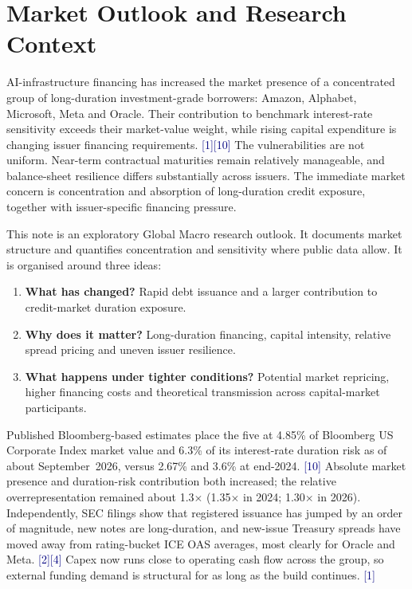 \documentclass[10pt,letterpaper]{article}
\newcommand{\src}[1]{{\scriptsize\textcolor{navy}{[#1]}}}
\begin{document}
\section{Market Outlook and Research Context}

AI-infrastructure financing has increased the market presence of a concentrated group of long-duration investment-grade borrowers: Amazon, Alphabet, Microsoft, Meta and Oracle. Their contribution to benchmark interest-rate sensitivity exceeds their market-value weight, while rising capital expenditure is changing issuer financing requirements. \src{1}\src{10} The vulnerabilities are not uniform. Near-term contractual maturities remain relatively manageable, and balance-sheet resilience differs substantially across issuers. The immediate market concern is concentration and absorption of long-duration credit exposure, together with issuer-specific financing pressure.

This note is an exploratory Global Macro research outlook. It documents market structure and quantifies concentration and sensitivity where public data allow. It is organised around three ideas:
\begin{enumerate}[leftmargin=1.2em,itemsep=0.2em]
  \item \textbf{What has changed?} Rapid debt issuance and a larger contribution to credit-market duration exposure.
  \item \textbf{Why does it matter?} Long-duration financing, capital intensity, relative spread pricing and uneven issuer resilience.
  \item \textbf{What happens under tighter conditions?} Potential market repricing, higher financing costs and theoretical transmission across capital-market participants.
\end{enumerate}

Published Bloomberg-based estimates place the five at 4.85\% of Bloomberg US Corporate Index market value and 6.3\% of its interest-rate duration risk as of about September~2026, versus 2.67\% and 3.6\% at end-2024. \src{10} Absolute market presence and duration-risk contribution both increased; the relative overrepresentation remained about 1.3$\times$ (1.35$\times$ in 2024; 1.30$\times$ in 2026). Independently, SEC filings show that registered issuance has jumped by an order of magnitude, new notes are long-duration, and new-issue Treasury spreads have moved away from rating-bucket ICE OAS averages, most clearly for Oracle and Meta. \src{2}\src{4} Capex now runs close to operating cash flow across the group, so external funding demand is structural for as long as the build continues. \src{1}
\end{document}
